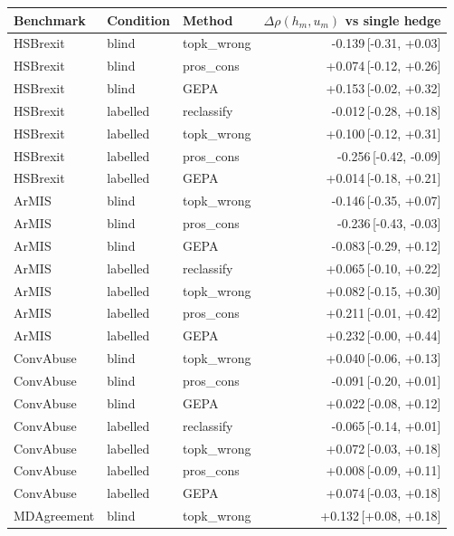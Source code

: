 \begin{table}[t]
\centering
\small
\begin{tabular}{lllr}
\hline
Benchmark & Condition & Method & $\Delta\rho(h_m,u_m)$ vs single hedge \\
\hline
HSBrexit & blind & topk\_wrong & -0.139{\scriptsize\,[-0.31, +0.03]} \\
HSBrexit & blind & pros\_cons & +0.074{\scriptsize\,[-0.12, +0.26]} \\
HSBrexit & blind & GEPA & +0.153{\scriptsize\,[-0.02, +0.32]} \\
HSBrexit & labelled & reclassify & -0.012{\scriptsize\,[-0.28, +0.18]} \\
HSBrexit & labelled & topk\_wrong & +0.100{\scriptsize\,[-0.12, +0.31]} \\
HSBrexit & labelled & pros\_cons & -0.256{\scriptsize\,[-0.42, -0.09]} \\
HSBrexit & labelled & GEPA & +0.014{\scriptsize\,[-0.18, +0.21]} \\
ArMIS & blind & topk\_wrong & -0.146{\scriptsize\,[-0.35, +0.07]} \\
ArMIS & blind & pros\_cons & -0.236{\scriptsize\,[-0.43, -0.03]} \\
ArMIS & blind & GEPA & -0.083{\scriptsize\,[-0.29, +0.12]} \\
ArMIS & labelled & reclassify & +0.065{\scriptsize\,[-0.10, +0.22]} \\
ArMIS & labelled & topk\_wrong & +0.082{\scriptsize\,[-0.15, +0.30]} \\
ArMIS & labelled & pros\_cons & +0.211{\scriptsize\,[-0.01, +0.42]} \\
ArMIS & labelled & GEPA & +0.232{\scriptsize\,[-0.00, +0.44]} \\
ConvAbuse & blind & topk\_wrong & +0.040{\scriptsize\,[-0.06, +0.13]} \\
ConvAbuse & blind & pros\_cons & -0.091{\scriptsize\,[-0.20, +0.01]} \\
ConvAbuse & blind & GEPA & +0.022{\scriptsize\,[-0.08, +0.12]} \\
ConvAbuse & labelled & reclassify & -0.065{\scriptsize\,[-0.14, +0.01]} \\
ConvAbuse & labelled & topk\_wrong & +0.072{\scriptsize\,[-0.03, +0.18]} \\
ConvAbuse & labelled & pros\_cons & +0.008{\scriptsize\,[-0.09, +0.11]} \\
ConvAbuse & labelled & GEPA & +0.074{\scriptsize\,[-0.03, +0.18]} \\
MDAgreement & blind & topk\_wrong & +0.132{\scriptsize\,[+0.08, +0.18]} \\

\end{tabular}
\end{table}
